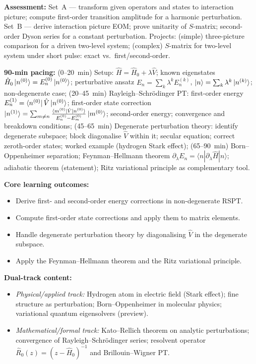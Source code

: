 \documentclass[11pt,a4paper]{article}
\begin{document}
\begin{tcolorbox}[modulebox, title={Module~I.3 --- Lecture L08: The Dirac (Interaction) Picture}]
\medskip\textbf{Assessment:}
Set~A --- transform given operators and states to interaction picture;
compute first-order transition amplitude for a harmonic perturbation.
Set~B --- derive interaction picture EOM; prove unitarity of $S$-matrix;
second-order Dyson series for a constant perturbation.
Projects: (simple) three-picture comparison for a driven two-level system;
(complex) $S$-matrix for two-level system under short pulse: exact vs.\ first/second-order.
\end{tcolorbox}

\medskip
\begin{tcolorbox}[modulebox, title={Module~I.3 --- Lecture L09: Perturbation Theory}]
\textbf{90-min pacing:} (0--20~min) Setup: $\hat{H}=\hat{H}_0+\lambda\hat{V}$;
known eigenstates $\hat{H}_0\ket{n^{(0)}}=E_n^{(0)}\ket{n^{(0)}}$;
perturbative ansatz $E_n=\sum_k\lambda^k E_n^{(k)}$,
$\ket{n}=\sum_k\lambda^k\ket{n^{(k)}}$; non-degenerate case;
(20--45~min) Rayleigh--Schr\"odinger PT: first-order energy $E_n^{(1)}=\bra{n^{(0)}}\hat{V}\ket{n^{(0)}}$;
first-order state correction $\ket{n^{(1)}}=\sum_{m\neq n}\tfrac{\bra{m^{(0)}}\hat{V}\ket{n^{(0)}}}{E_n^{(0)}-E_m^{(0)}}\ket{m^{(0)}}$;
second-order energy; convergence and breakdown conditions;
(45--65~min) Degenerate perturbation theory: identify degenerate subspace;
block diagonalise $\hat{V}$ within it; secular equation; correct zeroth-order states;
worked example (hydrogen Stark effect);
(65--90~min) Born--Oppenheimer separation;
Feynman--Hellmann theorem $\partial_\lambda E_n=\langle n|\partial_\lambda\hat{H}|n\rangle$;
adiabatic theorem (statement); Ritz variational principle as complementary tool.

\medskip\textbf{Core learning outcomes:}
\begin{itemize}[leftmargin=1.4em,topsep=2pt,itemsep=1pt]
  \item Derive first- and second-order energy corrections in non-degenerate RSPT.
  \item Compute first-order state corrections and apply them to matrix elements.
  \item Handle degenerate perturbation theory by diagonalising $\hat{V}$ in the degenerate subspace.
  \item Apply the Feynman--Hellmann theorem and the Ritz variational principle.
\end{itemize}

\medskip\textbf{Dual-track content:}
\begin{itemize}[leftmargin=1.4em,topsep=2pt,itemsep=1pt]
  \item \textit{Physical/applied track:} Hydrogen atom in electric field (Stark effect);
    fine structure as perturbation; Born--Oppenheimer in molecular physics;
    variational quantum eigensolvers (preview).
  \item \textit{Mathematical/formal track:} Kato--Rellich theorem on analytic perturbations;
    convergence of Rayleigh--Schr\"odinger series; resolvent operator
    $\hat{R}_0(z)=(z-\hat{H}_0)^{-1}$ and Brillouin--Wigner PT.
\end{itemize}


\end{tcolorbox}
\end{document}
